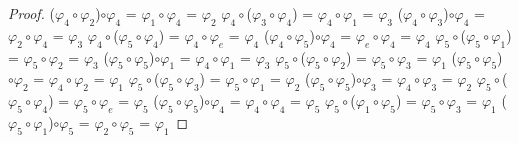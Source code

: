 \documentclass[10pt,a4paper,oneside]{article}
\begin{document}
\begin{proof}
				($\varphi_{4}\circ\varphi_{2}$)$\circ\varphi_{4}$ = $\varphi_{1}\circ\varphi_{4}$ = $\varphi_{2}$
				\newline
				\newline
				$\varphi_{4}\circ$($\varphi_{3}\circ\varphi_{4}$) = $\varphi_{4}\circ\varphi_{1}$ = $\varphi_{3}$
				\newline
				($\varphi_{4}\circ\varphi_{3}$)$\circ\varphi_{4}$ = $\varphi_{2}\circ\varphi_{4}$ = $\varphi_{3}$
				\newline
				\newline
				$\varphi_{4}\circ$($\varphi_{5}\circ\varphi_{4}$) = $\varphi_{4}\circ\varphi_{e}$ = $\varphi_{4}$
				\newline
				($\varphi_{4}\circ\varphi_{5}$)$\circ\varphi_{4}$ = $\varphi_{e}\circ\varphi_{4}$ = $\varphi_{4}$
				\newline
				\newline
				$\varphi_{5}\circ$($\varphi_{5}\circ\varphi_{1}$) = $\varphi_{5}\circ\varphi_{2}$ = $\varphi_{3}$
				\newline
				($\varphi_{5}\circ\varphi_{5}$)$\circ\varphi_{1}$ = $\varphi_{4}\circ\varphi_{1}$ = $\varphi_{3}$
				\newline
				\newline
				$\varphi_{5}\circ$($\varphi_{5}\circ\varphi_{2}$) = $\varphi_{5}\circ\varphi_{3}$ = $\varphi_{1}$
				\newline
				($\varphi_{5}\circ\varphi_{5}$)$\circ\varphi_{2}$ = $\varphi_{4}\circ\varphi_{2}$ = $\varphi_{1}$
				\newline
				\newline
				$\varphi_{5}\circ$($\varphi_{5}\circ\varphi_{3}$) = $\varphi_{5}\circ\varphi_{1}$ = $\varphi_{2}$
				\newline
				($\varphi_{5}\circ\varphi_{5}$)$\circ\varphi_{3}$ = $\varphi_{4}\circ\varphi_{3}$ = $\varphi_{2}$
				\newline
				\newline
				$\varphi_{5}\circ$($\varphi_{5}\circ\varphi_{4}$) = $\varphi_{5}\circ\varphi_{e}$ = $\varphi_{5}$
				\newline
				($\varphi_{5}\circ\varphi_{5}$)$\circ\varphi_{4}$ = $\varphi_{4}\circ\varphi_{4}$ = $\varphi_{5}$
				\newline
				\newline
				$\varphi_{5}\circ$($\varphi_{1}\circ\varphi_{5}$) = $\varphi_{5}\circ\varphi_{3}$ = $\varphi_{1}$
				\newline
				($\varphi_{5}\circ\varphi_{1}$)$\circ\varphi_{5}$ = $\varphi_{2}\circ\varphi_{5}$ = $\varphi_{1}$

\end{proof}
\end{document}
